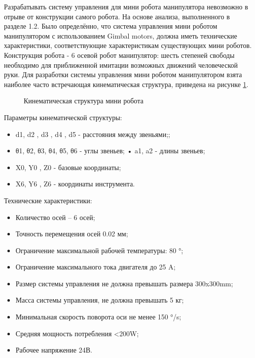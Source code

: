 Разрабатывать систему управления для мини робота манипулятора невозможно в отрыве от конструкции самого робота. На основе анализа, выполненного в разделе 1.2. Было определённо, что система управления мини роботом манипулятором с использованием Gimbal motors, должна иметь технические характеристики, соответствующие характеристикам существующих мини роботов. Конструкция робота - 6 осевой робот манипулятор: шесть степеней свободы необходимо для приближенной имитации возможных движений человеческой руки. Для разработки системы управления мини роботом манипулятором взята наиболее часто встречающая кинематическая структура, приведена на рисунке \ref{Kin}.


\begin{figure}[H]
	\centering
	
	\caption{Кинематическая структура мини робота}
	\label{Kin}
\end{figure}

Параметры кинематической структуры:

\begin{itemize}
	\item d1, d2 , d3 , d4 , d5 - расстояния между звеньями;;
	\item θ1, θ2, θ3, θ4, θ5, θ6 - углы звеньев;
	      • a1, a2 - длины звеньев;
	\item X0, Y0 , Z0 - базовые координаты;
	\item X6, Y6 , Z6 - координаты инструмента.
\end{itemize}

Технические характеристики:
\begin{itemize}
	\item Количество осей – 6 осей;
	\item Точность перемещения осей 0.02 мм;
	\item Ограничение максимальной рабочей температуры: 80 °;
	\item Ограничение максимального тока двигателя до 25 A;
	\item Размер системы управления не должна превышать размера 300x300mm;
	\item Масса системы управления, не должна превышать 5 кг;
	\item Минимальная скорость поворота оси не менее 150 °/s;
	\item Средняя мощность потребления <200W;
	\item Рабочее напряжение 24В.
\end{itemize}

